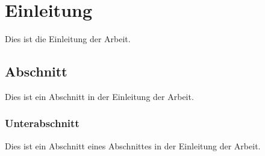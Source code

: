 %
% 


\chapter{Einleitung}

Dies ist die Einleitung der Arbeit.

\section{Abschnitt}

Dies ist ein Abschnitt in der Einleitung der Arbeit.

\subsection{Unterabschnitt}

Dies ist ein Abschnitt eines Abschnittes in der Einleitung der Arbeit.
 
